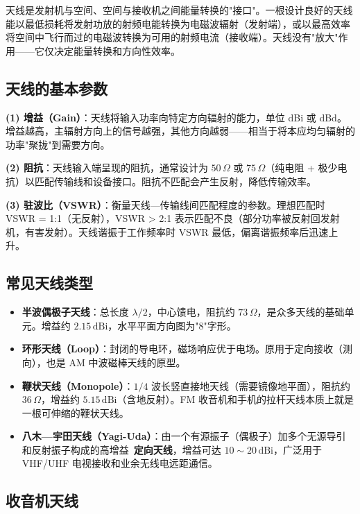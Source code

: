 \documentclass[12pt,UTF8]{ctexbook}
\begin{document}
天线是发射机与空间、空间与接收机之间能量转换的"接口"。一根设计良好的天线能以最低损耗将发射功放的射频电能转换为电磁波辐射（发射端），或以最高效率将空间中飞行而过的电磁波转换为可用的射频电流（接收端）。天线没有"放大"作用——它仅决定能量转换和方向性效率。

\subsection{天线的基本参数}

\textbf{(1) 增益（Gain）}：天线将输入功率向特定方向辐射的能力，单位 dBi 或 dBd。增益越高，主辐射方向上的信号越强，其他方向越弱——相当于将本应均匀辐射的功率"聚拢"到需要方向。

\textbf{(2) 阻抗}：天线输入端呈现的阻抗，通常设计为 $50\,\Omega$ 或 $75\,\Omega$（纯电阻 + 极少电抗）以匹配传输线和设备接口。阻抗不匹配会产生反射，降低传输效率。

\textbf{(3) 驻波比（VSWR）}：衡量天线—传输线间匹配程度的参数。理想匹配时 VSWR = 1:1（无反射），VSWR > 2:1 表示匹配不良（部分功率被反射回发射机，有害发射）。天线谐振于工作频率时 VSWR 最低，偏离谐振频率后迅速上升。

\subsection{常见天线类型}

\begin{itemize}
  \item \textbf{半波偶极子天线}：总长度 $\lambda/2$，中心馈电，阻抗约 $73\,\Omega$，是众多天线的基础单元。增益约 $2.15\,\mathrm{dBi}$，水平平面方向图为"8"字形。
  \item \textbf{环形天线（Loop）}：封闭的导电环，磁场响应优于电场。原用于定向接收（测向），也是 AM 中波磁棒天线的原型。
  \item \textbf{鞭状天线（Monopole）}：$1/4$ 波长竖直接地天线（需要镜像地平面），阻抗约 $36\,\Omega$，增益约 $5.15\,\mathrm{dBi}$（含地反射）。FM 收音机和手机的拉杆天线本质上就是一根可伸缩的鞭状天线。
  \item \textbf{八木—宇田天线（Yagi-Uda）}：由一个有源振子（偶极子）加多个无源导引和反射振子构成的高增益\ \textbf{定向天线}，增益可达 $10\sim20\,\mathrm{dBi}$，广泛用于 VHF/UHF 电视接收和业余无线电远距通信。
\end{itemize}

\subsection{收音机天线}
\end{document}
